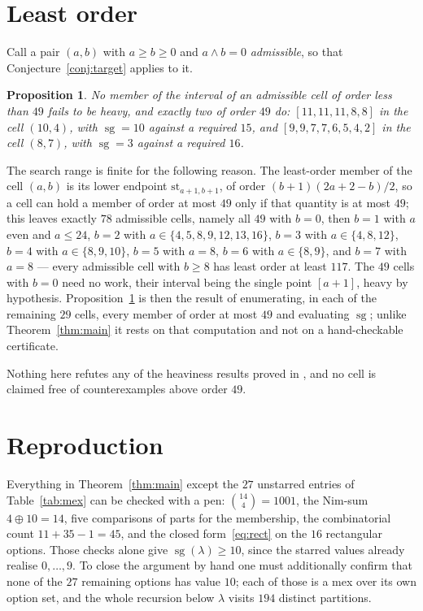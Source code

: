 \documentclass[11pt]{amsart}
\newtheorem{proposition}[theorem]{Proposition}
\theoremstyle{definition}
\theoremstyle{remark}
\newcommand{\br}[1]{[#1]}
\newcommand{\sgv}{\operatorname{sg}}
\newcommand{\str}{\mathrm{st}}
\begin{document}
\section{Least order}

Call a pair $(a,b)$ with $a\ge b\ge0$ and $a\wedge b=0$ \emph{admissible}, so
that Conjecture~\ref{conj:target} applies to it.

\begin{proposition}\label{prop:least}
No member of the interval of an admissible cell of order less than $49$ fails
to be heavy, and exactly two of order $49$ do: $\br{11,11,11,8,8}$ in the cell
$(10,4)$, with $\sgv=10$ against a required $15$, and
$\br{9,9,7,7,6,5,4,2}$ in the cell $(8,7)$, with $\sgv=3$ against a required
$16$.
\end{proposition}

The search range is finite for the following reason. The least-order member of
the cell $(a,b)$ is its lower endpoint $\str_{a+1,b+1}$, of order
$(b+1)(2a+2-b)/2$, so a cell can hold a member of order at most $49$ only if
that quantity is at most $49$; this leaves exactly $78$ admissible cells,
namely all $49$ with $b=0$, then $b=1$ with $a$ even and $a\le24$, $b=2$ with
$a\in\{4,5,8,9,12,13,16\}$, $b=3$ with $a\in\{4,8,12\}$, $b=4$ with
$a\in\{8,9,10\}$, $b=5$ with $a=8$, $b=6$ with $a\in\{8,9\}$, and $b=7$ with
$a=8$ --- every admissible cell with $b\ge8$ has least order at least $117$.
The $49$ cells with $b=0$ need no work, their interval being the single point
$\br{a+1}$, heavy by hypothesis. Proposition~\ref{prop:least} is then the
result of enumerating, in each of the remaining $29$ cells, every member of
order at most $49$ and evaluating $\sgv$; unlike Theorem~\ref{thm:main} it
rests on that computation and not on a hand-checkable certificate.

Nothing here refutes any of the heaviness results proved in \cite{GKM}, and no
cell is claimed free of counterexamples above order $49$.

\section{Reproduction}

Everything in Theorem~\ref{thm:main} except the $27$ unstarred entries of
Table~\ref{tab:mex} can be checked with a pen: $\binom{14}{4}=1001$, the
Nim-sum $4\oplus10=14$, five comparisons of parts for the membership, the
combinatorial count $11+35-1=45$, and the closed form~\eqref{eq:rect} on the
$16$ rectangular options. Those checks alone give $\sgv(\lambda)\ge10$, since
the starred values already realise $0,\dots,9$. To close the argument by hand
one must additionally confirm that none of the $27$ remaining options has value
$10$; each of those is a mex over its own option set, and the whole recursion
below $\lambda$ visits $194$ distinct partitions.
\end{document}
